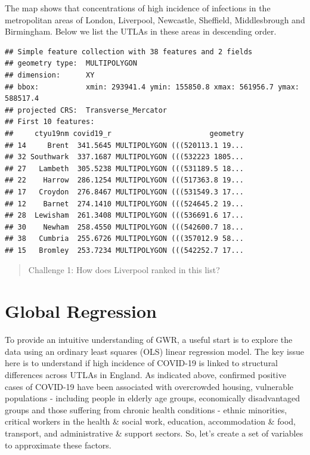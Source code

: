 \documentclass[
]{book}
\newenvironment{Shaded}{\begin{snugshade}}{\end{snugshade}}
\newcommand{\DecValTok}[1]{\textcolor[rgb]{0.00,0.00,0.81}{#1}}
\newcommand{\KeywordTok}[1]{\textcolor[rgb]{0.13,0.29,0.53}{\textbf{#1}}}
\newcommand{\NormalTok}[1]{#1}
\newcommand{\OperatorTok}[1]{\textcolor[rgb]{0.81,0.36,0.00}{\textbf{#1}}}
\newcommand{\StringTok}[1]{\textcolor[rgb]{0.31,0.60,0.02}{#1}}
\begin{document}
The map shows that concentrations of high incidence of infections in the metropolitan areas of London, Liverpool, Newcastle, Sheffield, Middlesbrough and Birmingham. Below we list the UTLAs in these areas in descending order.

\begin{Shaded}
\end{Shaded}

\begin{verbatim}
## Simple feature collection with 38 features and 2 fields
## geometry type:  MULTIPOLYGON
## dimension:      XY
## bbox:           xmin: 293941.4 ymin: 155850.8 xmax: 561956.7 ymax: 588517.4
## projected CRS:  Transverse_Mercator
## First 10 features:
##     ctyu19nm covid19_r                       geometry
## 14     Brent  341.5645 MULTIPOLYGON (((520113.1 19...
## 32 Southwark  337.1687 MULTIPOLYGON (((532223 1805...
## 27   Lambeth  305.5238 MULTIPOLYGON (((531189.5 18...
## 22    Harrow  286.1254 MULTIPOLYGON (((517363.8 19...
## 17   Croydon  276.8467 MULTIPOLYGON (((531549.3 17...
## 12    Barnet  274.1410 MULTIPOLYGON (((524645.2 19...
## 28  Lewisham  261.3408 MULTIPOLYGON (((536691.6 17...
## 30    Newham  258.4550 MULTIPOLYGON (((542600.7 18...
## 38   Cumbria  255.6726 MULTIPOLYGON (((357012.9 58...
## 15   Bromley  253.7234 MULTIPOLYGON (((542252.7 17...
\end{verbatim}

\begin{quote}
Challenge 1:
How does Liverpool ranked in this list?
\end{quote}

\hypertarget{global-regression}{%
\section{Global Regression}\label{global-regression}}

To provide an intuitive understanding of GWR, a useful start is to explore the data using an ordinary least squares (OLS) linear regression model. The key issue here is to understand if high incidence of COVID-19 is linked to structural differences across UTLAs in England. As indicated above, confirmed positive cases of COVID-19 have been associated with overcrowded housing, vulnerable populations - including people in elderly age groups, economically disadvantaged groups and those suffering from chronic health conditions - ethnic minorities, critical workers in the health \& social work, education, accommodation \& food, transport, and administrative \& support sectors. So, let's create a set of variables to approximate these factors.
\end{document}
